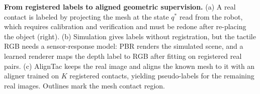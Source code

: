 \caption{\textbf{From registered labels to aligned geometric supervision.}
(a) A real contact is labeled by projecting the mesh at the state $q^\ast$ read from the robot, which requires calibration and verification and must be redone after re-placing the object (right).
(b) Simulation gives labels without registration, but the tactile RGB needs a sensor-response model: PBR renders the simulated scene, and a learned renderer maps the depth label to RGB after fitting on registered real pairs.
(c) AlignTac keeps the real image and aligns the known mesh to it with an aligner trained on $K$ registered contacts, yielding pseudo-labels for the remaining real images.
Outlines mark the mesh contact region.}
